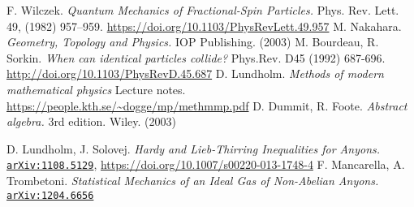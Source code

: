 
\begin{thebibliography}{99}



   F. Wilczek. \textit{Quantum Mechanics of Fractional-Spin Particles.} Phys. Rev. Lett. 49, (1982) 957–959. \url{https://doi.org/10.1103/PhysRevLett.49.957}
   M. Nakahara. \textit{Geometry, Topology and Physics.} IOP Publishing. (2003)
   M. Bourdeau, R. Sorkin. \textit{When can identical particles collide?} Phys.Rev. D45 (1992) 687-696. \url{http://doi.org/10.1103/PhysRevD.45.687}
   D. Lundholm. \textit{Methods of modern mathematical physics} Lecture notes. \url{https://people.kth.se/~dogge/mp/methmmp.pdf}
   D. Dummit, R. Foote. \textit{Abstract algebra.} 3rd edition. Wiley. (2003)

   D. Lundholm, J. Solovej. \textit{Hardy and Lieb-Thirring Inequalities for Anyons.} \href{https://arxiv.org/abs/1108.5129}{\texttt{arXiv:1108.5129}}, \url{https://doi.org/10.1007/s00220-013-1748-4}
   F. Mancarella, A. Trombetoni. \textit{Statistical Mechanics of an Ideal Gas of Non-Abelian Anyons.} \href{https://arxiv.org/abs/1204.6656}{\texttt{arXiv:1204.6656}}


\end{thebibliography}
